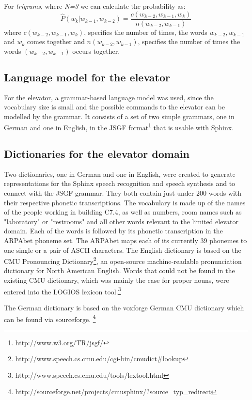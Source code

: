 \documentclass[a4paper, 12pt]{article}
\begin{document}
For \textit{trigrams}, where \textit{N=3} we can calculate the probability as:
\begin{equation}
  \hat{P}(w_k | w_{k-1},w_{k-2}) = \frac{c(w_{k-2},w_{k-1},w_k)}{n(w_{k-2},w_{k-1})}
\end{equation}
where $c(w_{k-2},w_{k-1},w_k)$, specifies the number of times, the words $w_{k-2},w_{k-1}$ and $w_k$ comes together and $n(w_{k-2},w_{k-1})$, specifies the number of times the words $(w_{k-2},w_{k-1})$ occurs together.

\subsection{Language model for the elevator}
For the elevator, a grammar-based language model was used, since the vocabulary size is small and the possible commands to the elevator can be modelled by the grammar.
It consists of a set of two simple grammars, one in German and one in English, in the JSGF format\footnote{http://www.w3.org/TR/jsgf/} that is usable with Sphinx.


\subsection{Dictionaries for the elevator domain}
Two dictionaries, one in German and one in English, were created to generate representations for the Sphinx speech recognition and speech synthesis and to connect with the JSGF grammar.
They both contain just under 200 words with their respective phonetic transcriptions.
The vocabulary is made up of the names of the people working in building C7.4, as well as numbers, room names such as "laboratory" or "restrooms" and all other words relevant to the limited elevator domain.
Each of the words is followed by its phonetic transcription in the ARPAbet phoneme set.
The ARPAbet maps each of its currently 39 phonemes to one single or a pair of ASCII characters.
The English dictionary is based on the CMU Pronouncing Dictionary\footnote{http://www.speech.cs.cmu.edu/cgi-bin/cmudict\#lookup}, an open-source  machine-readable pronunciation dictionary for North American English.
Words that could not be found in the existing CMU dictionary, which was mainly the case for proper nouns, were entered into the LOGIOS lexicon tool.\footnote{http://www.speech.cs.cmu.edu/tools/lextool.html}


The German dictionary is based on the voxforge German CMU dictionary which can be found via sourceforge.%
\footnote{http://sourceforge.net/projects/cmusphinx/?source=typ\_redirect}
\end{document}
